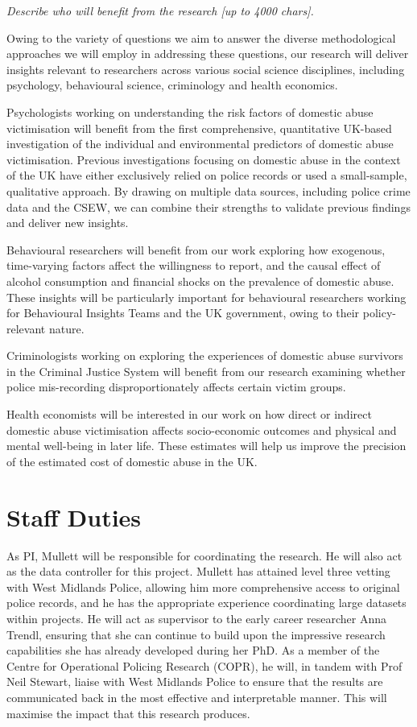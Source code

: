 \documentclass[11pt, a4paper]{article}
\begin{document}
\textit{Describe who will benefit from the research [up to 4000 chars].}

Owing to the variety of questions we aim to answer the diverse methodological approaches we will employ in addressing these questions, our research will deliver insights relevant to researchers across various social science disciplines, including psychology, behavioural science, criminology and health economics.

Psychologists working on understanding the risk factors of domestic abuse victimisation will benefit from the first comprehensive, quantitative UK-based investigation of the individual and environmental predictors of domestic abuse victimisation. Previous investigations focusing on domestic abuse in the context of the UK have either exclusively relied on police records or used a small-sample, qualitative approach. By drawing on multiple data sources, including police crime data and the CSEW, we can combine their strengths to validate previous findings and deliver new insights.

Behavioural researchers will benefit from our work exploring how exogenous, time-varying factors affect the willingness to report, and the causal effect of alcohol consumption and financial shocks on the prevalence of domestic abuse. These insights will be particularly important for behavioural researchers working for Behavioural Insights Teams and the UK government, owing to their policy-relevant nature.

Criminologists working on exploring the experiences of domestic abuse survivors in the Criminal Justice System will benefit from our research examining whether police mis-recording disproportionately affects certain victim groups. 


Health economists will be interested in our work on how direct or indirect domestic abuse victimisation affects socio-economic outcomes and physical and mental well-being in later life. These estimates will help us improve the precision of the estimated cost of domestic abuse in the UK.


\section{Staff Duties}

As PI, Mullett will be responsible for coordinating the research. He will also act as the data controller for this project. Mullett has attained level three vetting with West Midlands Police, allowing him more comprehensive access to original police records, and he has the appropriate experience coordinating large datasets within projects. He will act as supervisor to the early career researcher Anna Trendl, ensuring that she can continue to build upon the impressive research capabilities she has already developed during her PhD. As a member of the Centre for Operational Policing Research (COPR), he will, in tandem with Prof Neil Stewart, liaise with West Midlands Police to ensure that the results are communicated back in the most effective and interpretable manner. This will maximise the impact that this research produces.
\end{document}
